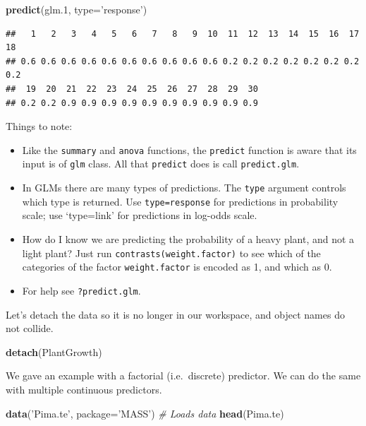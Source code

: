 \documentclass[]{book}
\newenvironment{Shaded}{\begin{snugshade}}{\end{snugshade}}
\newcommand{\KeywordTok}[1]{\textcolor[rgb]{0.13,0.29,0.53}{\textbf{#1}}}
\newcommand{\DataTypeTok}[1]{\textcolor[rgb]{0.13,0.29,0.53}{#1}}
\newcommand{\DecValTok}[1]{\textcolor[rgb]{0.00,0.00,0.81}{#1}}
\newcommand{\StringTok}[1]{\textcolor[rgb]{0.31,0.60,0.02}{#1}}
\newcommand{\CommentTok}[1]{\textcolor[rgb]{0.56,0.35,0.01}{\textit{#1}}}
\newcommand{\NormalTok}[1]{#1}
\providecommand{\tightlist}{%
  \setlength{\itemsep}{0pt}\setlength{\parskip}{0pt}}
\theoremstyle{definition}
\theoremstyle{definition}
\theoremstyle{definition}
\theoremstyle{remark}
\begin{document}
\begin{Shaded}
\begin{Highlighting}[]
\KeywordTok{predict}\NormalTok{(glm.}\DecValTok{1}\NormalTok{, }\DataTypeTok{type=}\StringTok{'response'}\NormalTok{)}
\end{Highlighting}
\end{Shaded}

\begin{verbatim}
##   1   2   3   4   5   6   7   8   9  10  11  12  13  14  15  16  17  18 
## 0.6 0.6 0.6 0.6 0.6 0.6 0.6 0.6 0.6 0.6 0.2 0.2 0.2 0.2 0.2 0.2 0.2 0.2 
##  19  20  21  22  23  24  25  26  27  28  29  30 
## 0.2 0.2 0.9 0.9 0.9 0.9 0.9 0.9 0.9 0.9 0.9 0.9
\end{verbatim}

Things to note:

\begin{itemize}
\tightlist
\item
  Like the \texttt{summary} and \texttt{anova} functions, the
  \texttt{predict} function is aware that its input is of \texttt{glm}
  class. All that \texttt{predict} does is call \texttt{predict.glm}.
\item
  In GLMs there are many types of predictions. The \texttt{type}
  argument controls which type is returned. Use \texttt{type=response}
  for predictions in probability scale; use `type=link' for predictions
  in log-odds scale.
\item
  How do I know we are predicting the probability of a heavy plant, and
  not a light plant? Just run \texttt{contrasts(weight.factor)} to see
  which of the categories of the factor \texttt{weight.factor} is
  encoded as 1, and which as 0.
\item
  For help see \texttt{?predict.glm}.
\end{itemize}

Let's detach the data so it is no longer in our workspace, and object
names do not collide.

\begin{Shaded}
\begin{Highlighting}[]
\KeywordTok{detach}\NormalTok{(PlantGrowth)}
\end{Highlighting}
\end{Shaded}

We gave an example with a factorial (i.e.~discrete) predictor. We can do
the same with multiple continuous predictors.

\begin{Shaded}
\begin{Highlighting}[]
\KeywordTok{data}\NormalTok{(}\StringTok{'Pima.te'}\NormalTok{, }\DataTypeTok{package=}\StringTok{'MASS'}\NormalTok{) }\CommentTok{# Loads data}
\KeywordTok{head}\NormalTok{(Pima.te)}
\end{Highlighting}
\end{Shaded}
\end{document}
